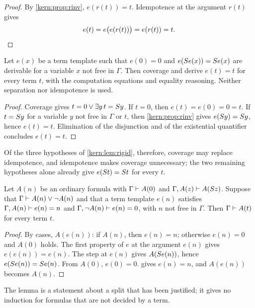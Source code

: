 \begin{proof}
By \cref{kern:prop:rinv}, $e(r(t))=t$.  Idempotence at the argument $r(t)$
gives
\[
 e(t)=e\bigl(e(r(t))\bigr)=e(r(t))=t . \qedhere
\]
\end{proof}

\begin{corollary}
\label{kern:cor:rigidcov}
Let $e(x)$ be a term template such that $e(0)=0$ and
$e(S e(x))=S e(x)$ are derivable for a variable $x$ not free in
$\Gamma$.  Then coverage and  derive $e(t)=t$ for every term
$t$, with the computation equations and equality reasoning.  Neither
separation nor idempotence is used.
\end{corollary}

\begin{proof}
Coverage gives $t=0\vee\exists y\,t=S y$.  If $t=0$, then
$e(t)=e(0)=0=t$.  If $t=S y$ for a variable $y$ not free in $\Gamma$ or
$t$, then \cref{kern:prop:rinv} gives $e(S y)=S y$, hence $e(t)=t$.
Elimination of the disjunction and of the existential quantifier concludes
$e(t)=t$.
\end{proof}

Of the three hypotheses of \cref{kern:lem:rigid}, therefore, coverage may
replace idempotence, and idempotence makes coverage unnecessary; the two
remaining hypotheses alone already give $e(S t)=S t$ for every $t$.

\begin{lemma}
\label{kern:lem:split}
Let $A(n)$ be an ordinary formula with $\Gamma\vdash A(0)$ and
$\Gamma,A(z)\vdash A(S z)$.  Suppose that
$\Gamma\vdash A(n)\vee\neg A(n)$ and that a term template $e(n)$ satisfies
$\Gamma,A(n)\vdash e(n)=n$ and $\Gamma,\neg A(n)\vdash e(n)=0$, with $n$
not free in $\Gamma$.  Then $\Gamma\vdash A(t)$ for every term $t$.
\end{lemma}

\begin{proof}
By cases, $A(e(n))$: if $A(n)$, then $e(n)=n$; otherwise $e(n)=0$ and
$A(0)$ holds.  The first property of $e$ at the argument $e(n)$ gives
$e(e(n))=e(n)$.  The step at $e(n)$ gives $A(S e(n))$, hence
$e(S e(n))=S e(n)$.  From $A(0)$, $e(0)=0$.
 gives $e(n)=n$, and $A(e(n))$ becomes $A(n)$.
\end{proof}

The lemma is a statement about a split that has been justified; it gives no
induction for formulas that are not decided by a term.

